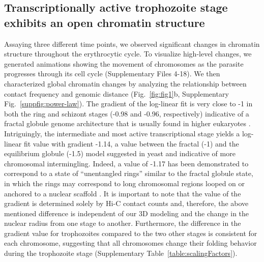 \subsection*{Transcriptionally active trophozoite stage exhibits an open chromatin structure}
Assaying three different time points, we observed significant changes in chromatin structure throughout the erythrocytic cycle. To visualize high-level changes, we generated animations showing the movement of chromosomes as the parasite progresses through its cell cycle (Supplementary Files 4-18). We then characterized global chromatin changes by analyzing the relationship between contact frequency and genomic distance (Fig.~\ref{fig:fig1}b, Supplementary Fig.~\ref*{suppfig:power-law}). The gradient of the log-linear fit is very close to -1 in both the ring and schizont stages (-0.98 and -0.96, respectively) indicative of a fractal globule genome architecture that is usually found in higher eukaryotes \citep{lieberman-aiden:comprehensive}. Intriguingly, the intermediate and most active transcriptional stage yields a log-linear fit value with gradient -1.14, a value between the fractal (-1) and the equilibrium globule (-1.5) model suggested in yeast \citep{fudenberg:higher-order} and indicative of more chromosomal intermingling. Indeed, a value of -1.17 has been demonstrated to correspond to a state of ``unentangled rings'' similar to the fractal globule state, in which the rings may correspond to long chromosomal regions looped on or anchored to a nuclear scaffold \citep{vettorel:statistics}. It is important to note that the value of the gradient is determined solely by Hi-C contact counts and,  therefore, the above mentioned difference is independent of our 3D modeling and the change in the nuclear radius from one stage to another. Furthermore, the difference in the gradient value for trophozoites compared to the two other stages is consistent for each chromosome, suggesting that all chromosomes change their folding behavior during the trophozoite stage (Supplementary Table~\ref*{table:scalingFactors}).

